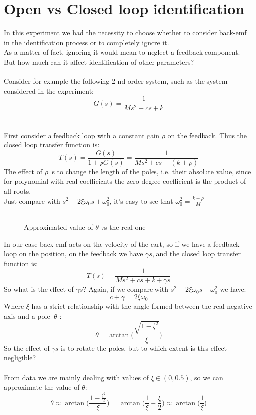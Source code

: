 \section{Open vs Closed loop identification}
\label{olvscl}
In this experiment we had the necessity to choose whether to consider back-emf in the identification process or to completely ignore it. \\
As a matter of fact, ignoring it would mean to neglect a feedback component. But how much can it affect identification of other parameters?
\\ \\
Consider for example the following 2-nd order system, such as the system considered in the experiment:
$$G(s) = \frac{1}{Ms^2+cs+k}$$
\\ \\
First consider a feedback loop with a constant gain $\rho$ on the feedback. Thus the closed loop transfer function is:
$$T(s) = \frac{G(s)}{1+\rho G(s)} = \frac{1}{Ms^2+cs+(k+\rho )}$$
The effect of $\rho$ is to change the length of the poles, i.e. their absolute value, since for polynomial with real coefficients the zero-degree coefficient is the product of all roots. \\
Just compare with $s^2+2\xi \omega_0 s+ \omega_0^2$, it's easy to see that $\omega_0^2 = \frac{k+\rho}{M}$.
\\\ \\
\begin{wrapfigure}{R}{0.4\textwidth}
\caption{Approximated value of $\theta$ vs the real one} \label{fig:theta_comparison}
\end{wrapfigure}
In our case  back-emf acts on the velocity of the cart, so if we have a feedback loop on the position, on the feedback we have  $\gamma s$, and the  closed loop transfer function is:
$$T(s) = \frac{1}{Ms^2+cs+k+\gamma s}$$
So what is the effect of $\gamma s$?
Again, if we compare with $s^2+2\xi \omega_0 s+ \omega_0^2$ we have:
$$c+\gamma = 2\xi \omega_0$$
Where $\xi$ has a strict relationship with the angle formed between the real negative axis and a pole,  $\theta$ :
$$\theta = \arctan \Big(\frac{\sqrt{1-\xi^2}}{\xi} \Big)$$
So the effect of $\gamma s$ is to rotate the poles, but to which extent is this effect negligible? \\ \\
From data we are mainly dealing with values of $\xi \in (0, 0.5)$, so we can approximate the value of $\theta$:
$$\theta \approx \arctan \Big(\frac{1-\frac{\xi^2}{2}}{\xi} \Big) = \arctan \Big(\frac{1}{\xi}-\frac{\xi}{2} \Big) \approx \arctan \Big (\frac{1}{\xi} \Big)$$

